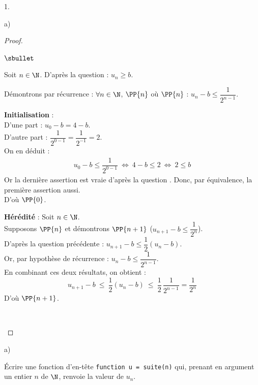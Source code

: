 \begin{noliste}{1.}
\begin{noliste}{a)}
    \begin{proof}~
      \begin{noliste}{$\sbullet$}
	\item Soit $n\in \N$. D'après la question  : $u_n \geq 
	b$.
	
	\item Démontrons par récurrence : $\forall n\in \N$, $\PP{n}$
	\quad où \quad $\PP{n}$ : $u_n -b \leq \dfrac{1}{2^{n-1}}$.
	\begin{noliste}{\fitem}
	  \item {\bf Initialisation} :\\
	  D'une part : $u_0-b = 4-b$.\\
	  D'autre part : $\dfrac{1}{2^{0-1}} = \dfrac{1}{2^{-1}} = 2$.\\
	  On en déduit :
	  \[
	    \begin{array}{rcl}
	      u_0 -b \leq \dfrac{1}{2^{0-1}} \ \Leftrightarrow \
	      4-b \leq 2 \ \Leftrightarrow \ 2 \leq b
	    \end{array}
	  \]
	  Or la dernière assertion est vraie d'après la question 
	  . Donc, par équivalence, la première assertion 
	  aussi.\\
	  D'où $\PP{0}$.
	  
	  \item {\bf Hérédité} : Soit $n\in\N$.\\
	  Supposons $\PP{n}$ et démontrons $\PP{n+1}$ (\ie $u_{n+1} 
	  -b \leq \dfrac{1}{2^n}$).\\
	  D'après la question précédente : $u_{n+1} -b \leq 
	  \dfrac{1}{2}(u_n -b)$.\\[.1cm]
	  Or, par hypothèse de récurrence : $u_n -b \leq 
	  \dfrac{1}{2^{n-1}}$.\\[.1cm]
	  En combinant ces deux résultats, on obtient :
	  \[
	    u_{n+1} -b \ \leq \ \dfrac{1}{2} (u_n -b) \ \leq \ 
	    \dfrac{1}{2}
	    \, \dfrac{1}{2^{n-1}} = \dfrac{1}{2^n}
	  \]
	  D'où $\PP{n+1}$.
	\end{noliste}
	~\\[-1.2cm]
      \end{noliste}
    \end{proof}
  \end{noliste}
  
  \item 
  \begin{noliste}{a)}
    \setlength{\itemsep}{2mm}
    \item Écrire une fonction \Scilab{} d'en-tête {\tt function u = 
    suite(n)} qui, prenant en argument un entier $n$ de $\N$, renvoie 
    la valeur de $u_n$.
    

\end{noliste}
\end{noliste}
